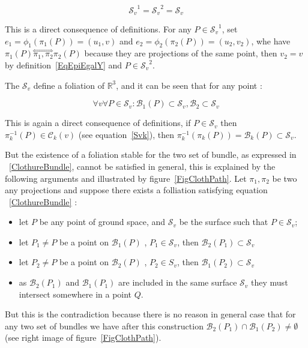 \documentclass[a4paper]{article}
\newcommand{\RR}{\ensuremath{\mathbb{R}}}
\newcommand{\HComp}{\overset{\Longleftrightarrow}{\scriptscriptstyle \pi_1,\pi_2}}
\newcommand{\Bund}[1]{\ensuremath{\mathcal{B}_{#1}}}
\newcommand{\BundO}{\Bund{1}}
\newcommand{\BundT}{\Bund{2}}
\newcommand{\BundK}{\Bund{k}}
\newcommand{\CurveE}[1]{\ensuremath{\mathcal{C}_{#1}}}
\newcommand{\CurveK}{\CurveE{k}}
\newcommand{\Sv}{\ensuremath{\mathcal{S}_{v}}}
\begin{document}
\begin{equation}
   \Sv^1 = \Sv^2 = \Sv
\end{equation}

This is a direct consequence of definitions. For any $P\in\Sv^1$, set  $e_1=\phi_1(\pi_1(P))=(u_1,v)$
and $e_2=\phi_2(\pi_2(P))=(u_2,v_2)$, whe have $\pi_1(P) \HComp \pi_2(P)$ because they are projections
of the same point, then $v_2=v$ by definition~\ref{EqEpiEgalY} and $P \in \Sv^2$.

The $\Sv$ define a foliation of $\RR^3$, and it can be seen that for any point :

\begin{equation}
   \forall v \forall P \in \Sv :  \BundO(P) \subset \Sv , \BundT \subset \Sv \label{ClothureBundle}
\end{equation}

This is again a direct consequence of definitions, if $P \in \Sv$ then $\pi_k^{-1}(P) \in \CurveK(v)$
(see equation~\ref{Svk}), then $\pi_k^{-1}(\pi_k(P)) = \BundK(P) \subset \Sv$.


But the existence of a foliation stable for the two set of bundle, as expressed in  ~\ref{ClothureBundle},
cannot  be satisfied in general, this is explained by the following arguments and illustrated 
by figure~\ref{FigClothPath}.  Let $\pi_1,\pi_2$ be two any projections and suppose
there exists  a folliation satisfying equation ~\ref{ClothureBundle} :

\begin{itemize}
   \item  let $P$ be any point of ground space, and $\Sv$ be the surface such that $P \in \Sv$;
   \item  let $P_1 \neq P$ be a point on $\BundO(P)$ , $P_1 \in \Sv$, then $\BundT(P_1) \subset \Sv$
   \item  let $P_2 \neq P$ be a point on $\BundT(P)$ , $P_2 \in S_v$, then $\BundO(P_2) \subset \Sv$
   \item  as $\BundT(P_1)$ and $\BundO(P_1)$ are included in the same surface $\Sv$ they
            must intersect somewhere in a point $Q$.
\end{itemize}

But this is the contradiction because there is no reason in general case that for any two set 
of bundles we have after this construction $\BundT(P_1) \cap \BundO(P_2) \neq \emptyset $
(see right image of figure~\ref{FigClothPath}).
\end{document}
